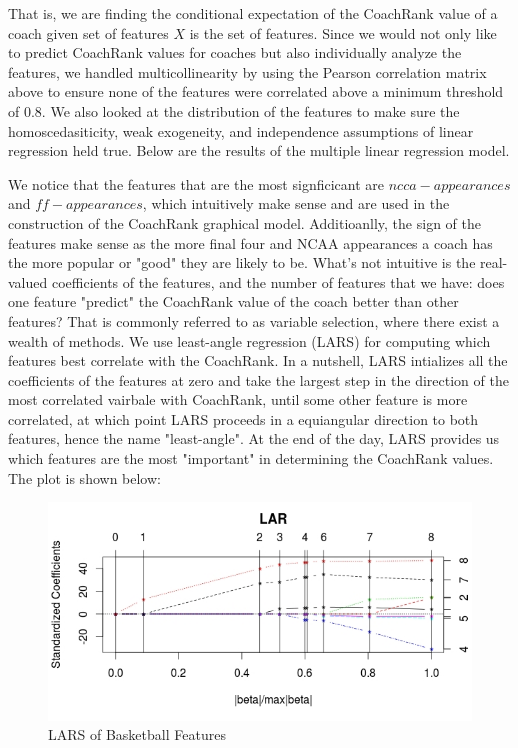 \documentclass[titlepage,12pt]{article}
\begin{document}
\noindent That is, we are finding the conditional expectation of the CoachRank value of a coach given set of features $X$ is the set of features. Since we would not only like to predict CoachRank values for coaches but also individually analyze the features, we handled multicollinearity by using the Pearson correlation matrix above to ensure none of the features were correlated above a minimum threshold of $0.8$. We also looked at the distribution of the features to make sure the homoscedasiticity, weak exogeneity, and independence assumptions of linear regression held true. Below are the results of the multiple linear regression model. 

\vspace{2 mm}

\noindent We notice that the features that are the most signficicant are $ncca-appearances$ and $ff-appearances$, which intuitively make sense and are used in the construction of the CoachRank graphical model. Additioanlly, the sign of the features make sense as the more final four and NCAA appearances a coach has the more popular or "good" they are likely to be. What's not intuitive is the real-valued coefficients of the features, and the number of features that we have: does one feature "predict" the CoachRank value of the coach better than other features? That is commonly referred to as variable selection, where there exist a wealth of methods. We use least-angle regression (LARS) for computing which features best correlate with the CoachRank. In a nutshell, LARS intializes all the coefficients of the features at zero and take the largest step in the direction of the most correlated vairbale with CoachRank, until some other feature is more correlated, at which point LARS proceeds in a equiangular direction to both features, hence the name "least-angle". At the end of the day, LARS provides us which features are the most "important" in determining the CoachRank values. The plot is shown below:

\begin{figure}[H]
      \caption{LARS of Basketball Features}
      \centering
      \includegraphics[width=1.0\textwidth]{basketball_lars.jpg}
\end{figure}
\end{document}
